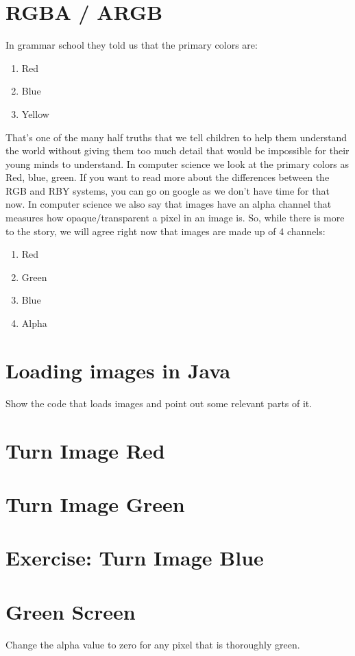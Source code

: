 \documentclass[12pt]{article}
\begin{document}
\section{RGBA / ARGB}
In grammar school they told us that the primary colors are:
\begin{enumerate}
\item Red
\item Blue
\item Yellow
\end{enumerate}
That's one of the many half truths that we tell children to help them understand the world without giving them too much detail that would be impossible for their young minds to understand. In computer science we look at the primary colors as Red, blue, green. If you want to read more about the differences between the RGB and RBY systems, you can go on google as we don't have time for that now. In computer science we also say that images have an alpha channel that measures how opaque/transparent a pixel in an image is. So, while there is more to the story, we will agree right now that images are made up of 4 channels:
\begin{enumerate}
\item Red
\item Green
\item Blue
\item Alpha
\end{enumerate}

\section{Loading images in Java}
Show the code that loads images and point out some relevant parts of it.

\section{Turn Image Red}

\section{Turn Image Green}

\section{Exercise: Turn Image Blue}

\section{Green Screen}
Change the alpha value to zero for any pixel that is thoroughly green.
\end{document}
